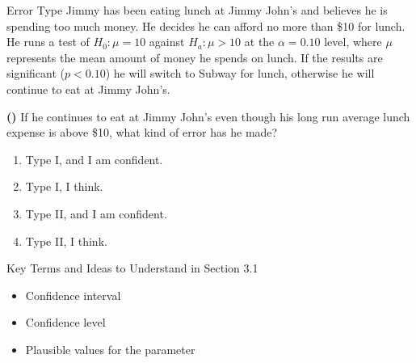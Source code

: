 \documentclass[13pt]{beamer}
\newcounter{count}
\newcommand{\question}{ \textbf{(\decimal{count})} \stepcounter{count}}
\begin{document}
\begin{frame}{Error Type}
Jimmy has been eating lunch at Jimmy John's and believes he is spending too much money. He decides he can afford no more than \$10 for lunch. He runs a test of $H_0:\mu=10$ against $H_a:\mu>10$ at the $\alpha=0.10$ level, where $\mu$ represents the mean amount of money he spends on lunch. If the results are significant ($p<0.10$) he will switch to Subway for lunch, otherwise he will continue to eat at Jimmy John's.\smallskip

\question If he continues to eat at Jimmy John's even though his long run average lunch expense is above \$10, what kind of error has he made?
\begin{enumerate}[A]
	\item Type I, and I am confident.
    \item Type I, I think.
    \item Type II, and I am confident.
    \item Type II, I think.
\end{enumerate}
\end{frame}

\begin{frame}{Key Terms and Ideas to Understand in Section 3.1}
\begin{itemize}
	\item Confidence interval
    \item Confidence level
    \item Plausible values for the parameter
\end{itemize}
\end{frame}
\end{document}
